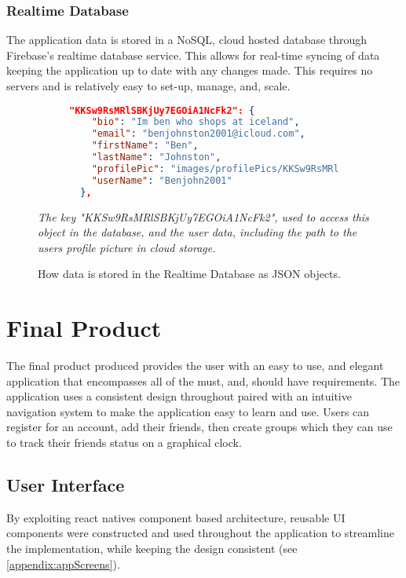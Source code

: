 \subsubsection{Realtime Database}
The application data is stored in a NoSQL, cloud hosted  database through Firebase's realtime database service. This allows for real-time syncing of data keeping the application up to date with any changes made. This requires no servers and is relatively easy to set-up, manage, and, scale.
\begin{figure}[!htbp]
\centering
\begin{subfigure}[b]{0.85\textwidth}
\begin{lstlisting}[language=json]
"KKSw9RsMRlSBKjUy7EGOiA1NcFk2": {
    "bio": "Im ben who shops at iceland",
    "email": "benjohnston2001@icloud.com",
    "firstName": "Ben",
    "lastName": "Johnston",
    "profilePic": "images/profilePics/KKSw9RsMRlSBKjUy7EGOiA1NcFk2",
    "userName": "Benjohn2001"
  },
\end{lstlisting}
\end{subfigure}
\caption{How data is stored in the Realtime Database as JSON objects.}
\small\par\textit{{The key "KKSw9RsMRlSBKjUy7EGOiA1NcFk2", used to access this object in the database, and the user data, including the path to the users profile picture in cloud storage.}}
\label{jsonResp}
\end{figure}

\section{Final Product}
The final product produced provides the user with an easy to use, and elegant application that encompasses all of the must, and, should have requirements. The application uses a consistent design throughout paired with an intuitive navigation system to make the  application easy to learn and use. Users can register for an account, add their friends, then create groups which they can use to track their friends status on a graphical clock.
\subsection{User Interface}
By exploiting react natives component based architecture, reusable UI components were constructed and used throughout the application to streamline the implementation, while keeping the design consistent (see \ref{appendix:appScreens}).
